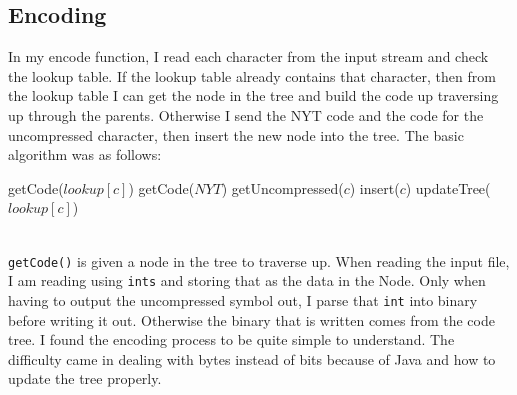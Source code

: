\documentclass{article}
\begin{document}
\subsection{Encoding}
In my encode function, I read each character from the input stream and check the lookup table. If the lookup table already contains that character, then from the lookup table I can get the node in the tree and build the code up traversing up through the parents. Otherwise I send the NYT code and the code for the uncompressed character, then insert the new node into the tree. The basic algorithm was as follows:
\begin{algorithm}
\begin{algorithmic}
    	\State getCode($lookup[c]$)
    \Else
    	\State getCode($NYT$)
    	\State getUncompressed($c$)
    	\State insert($c$)
    \EndIf
    \State updateTree($lookup[c]$)
\EndWhile
\end{algorithmic}
\end{algorithm}
\\ \texttt{getCode()} is given a node in the tree to traverse up. When reading the input file, I am reading using \texttt{ints} and storing that as the data in the Node. Only when having to output the uncompressed symbol out, I parse that \texttt{int} into binary before writing it out. Otherwise the binary that is written comes from the code tree. I found the encoding process to be quite simple to understand. The difficulty came in dealing with bytes instead of bits because of Java and how to update the tree properly. 
\end{document}

